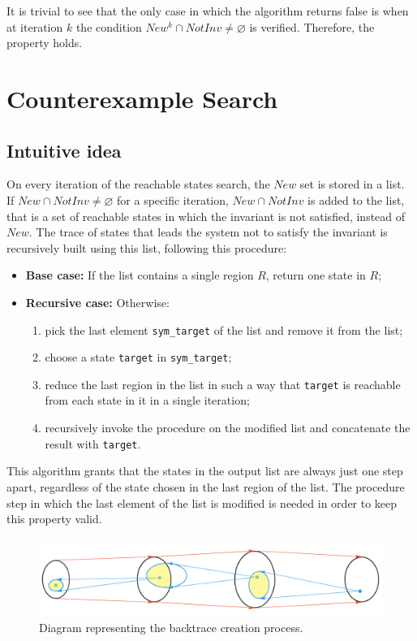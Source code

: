 \documentclass[12pt]{article}
\begin{document}
    It is trivial to see that the only case in which the algorithm returns false is when at iteration $k$ the condition $New^k \cap NotInv \neq \varnothing$ is verified.
    Therefore, the property holds.
    
    \section{Counterexample Search}
    \subsection{Intuitive idea}
    On every iteration of the reachable states search, the $New$ set is stored in a list.
    If $New \cap NotInv \neq \varnothing$ for a specific iteration, $New \cap NotInv$ is added to the list, that is a set of reachable states in which the invariant is not satisfied, instead of $New$.
    The trace of states that leads the system not to satisfy the invariant is recursively built using this list, following this procedure:
    \begin{itemize}
        \item \textbf{Base case:} If the list contains a single region $R$, return one state in $R$;
        \item \textbf{Recursive case:} Otherwise:
        \begin{enumerate}
            \item pick the last element \texttt{sym\_target} of the list and remove it from the list;
            \item choose a state \texttt{target} in \texttt{sym\_target};
            \item reduce the last region in the list in such a way that \texttt{target} is reachable from each state in it in a single iteration;
            \item recursively invoke the procedure on the modified list and concatenate the result with \texttt{target}.
        \end{enumerate}
    \end{itemize}
    This algorithm grants that the states in the output list are always just one step apart, regardless of the state chosen in the last region of the list.
    The procedure step in which the last element of the list is modified is needed in order to keep this property valid.
    
    \begin{figure}[H] 
        \centering
        \includegraphics[width=\textwidth]{backtrace-diagram.png}
        \caption{Diagram representing the backtrace creation process.}
        \label{fig:back_trace}
    \end{figure}
\end{document}
